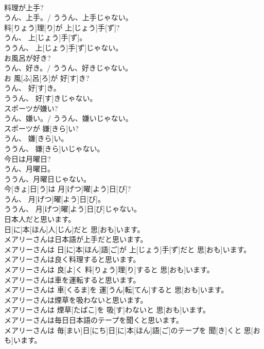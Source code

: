 \documentclass[8pt]{extreport}
\begin{document}
\begin{CJK}{UTF8}{min}
\\	料理が上手? 
\\	うん、上手。/ ううん、上手じゃない。	
\\	料[りょう]理[り]が 上[じょう]手[ず]? 
\\	うん、 上[じょう]手[ず]。 
\\	ううん、 上[じょう]手[ず]じゃない。
\\	お風呂が好き? 
\\	うん、好き。/ ううん、好きじゃない。	
\\	お 風[ふ]呂[ろ]が 好[す]き? 
\\	うん、 好[す]き。 
\\	ううん、 好[す]きじゃない。
\\	スポーツが嫌い? 
\\	うん、嫌い。/ ううん、嫌いじゃない。	
\\	スポーツが 嫌[きら]い? 
\\	うん、 嫌[きら]い。 
\\	ううん、 嫌[きら]いじゃない。
\\	今日は月曜日? 
\\	うん、月曜日。 
\\	ううん、月曜日じゃない。	
\\	今[きょ]日[う]は 月[げつ]曜[よう]日[び]? 
\\	うん、 月[げつ]曜[よう]日[び]。 
\\	ううん、 月[げつ]曜[よう]日[び]じゃない。
\\	日本人だと思います。	
\\	日[に]本[ほん]人[じん]だと 思[おも]います。
\\	メアリーさんは日本語が上手だと思います。	
\\	メアリーさんは 日[に]本[ほん]語[ご]が 上[じょう]手[ず]だと 思[おも]います。
\\	メアリーさんは良く料理すると思います。	
\\	メアリーさんは 良[よ]く 料[りょう]理[り]すると 思[おも]います。
\\	メアリーさんは車を運転すると思います。	
\\	メアリーさんは 車[くるま]を 運[うん]転[てん]すると 思[おも]います。
\\	メアリーさんは煙草を吸わないと思います。	
\\	メアリーさんは 煙草[たばこ]を 吸[す]わないと 思[おも]います。
\\	メアリーさんは毎日日本語のテープを聞くと思います。	
\\	メアリーさんは 毎[まい]日[にち]日[に]本[ほん]語[ご]のテープを 聞[き]くと 思[おも]います。

\end{CJK}
\end{document}
